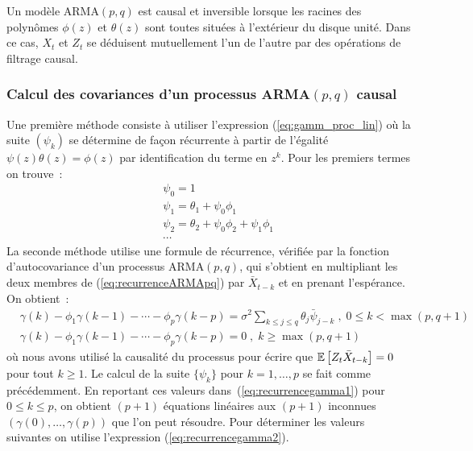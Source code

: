 Un mod\`ele ARMA$(p,q)$ est causal et inversible lorsque
les racines des polyn\^omes $\phi(z)$ et $\theta(z)$ sont toutes
situ\'ees \`a l'ext\'erieur du disque unit\'e. Dans ce cas, $X_t$ et $Z_t$
se d\'eduisent mutuellement l'un de l'autre par des op\'erations de
filtrage causal.

\subsubsection{Calcul des covariances d'un processus ARMA$(p,q)$ causal}
Une premi\`ere m\'ethode consiste \`a utiliser l'expression
(\ref{eq:gamm_proc_lin}) %
   o\`u la suite $(\psi_k)$ se d\'etermine de fa\c{c}on r\'ecurrente \`a partir de
   l'\'egalit\'e $\psi(z)\theta(z)=\phi(z)$ par identification du terme en $z^k$.
   Pour les premiers termes on trouve~:
\begin{eqnarray*}
 &&\psi_0=1\\
 &&\psi_1=\theta_1+\psi_0\phi_1\\
 &&\psi_2=\theta_2+\psi_0\phi_2+\psi_1\phi_1\\
 &&\cdots
\end{eqnarray*}
La seconde m\'ethode utilise une formule de r\'ecurrence, v\'erifi\'ee par
la fonction d'autocovariance d'un processus ARMA$(p,q)$, qui
s'obtient en multipliant les deux membres de
(\ref{eq:recurrenceARMApq}) par $\bar{X}_{t-k}$ et en prenant
l'esp\'erance. On obtient~:
\begin{align}
 \label{eq:recurrencegamma1}
  &\gamma(k)-\phi_1\gamma(k-1)-\cdots-\phi_p\gamma(k-p)
  =
  \sigma^2\sum_{k\leq j\leq q}\theta_j\bar{\psi}_{j-k}\;,\;
0\leq k < \max(p,q+1)
  \\
 \label{eq:recurrencegamma2}
  &\gamma(k)-\phi_1\gamma(k-1)-\cdots-\phi_p\gamma(k-p)
  =
  0\;,\; k \geq \max(p,q+1)
\end{align}
o\`u nous avons utilis\'e la causalit\'e du processus pour \'ecrire
que ${\mathbb E}\left[ Z_t \bar{X}_{t-k} \right]=0$ pour tout $k\geq 1$. Le calcul de la
suite $\{\psi_k\}$ pour $k=1,\dots, p$ se fait comme pr\'ec\'edemment.
En reportant ces valeurs dans~(\ref{eq:recurrencegamma1}) pour
$0\leq k \leq p$, on obtient $(p+1)$ \'equations lin\'eaires aux
$(p+1)$ inconnues $(\gamma(0),\dots,\gamma(p))$ que l'on peut
r\'esoudre. Pour d\'eterminer les valeurs suivantes on utilise
l'expression (\ref{eq:recurrencegamma2}).
